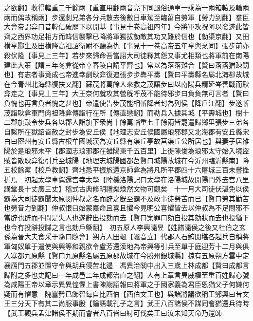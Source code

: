 之欲翻】收得輜重二千餘兩【重直用翻兩音亮下同風俗通車一乘為一兩箱轅及輪兩兩而偶故稱兩】步還劇兄弟各分兵散去後數日車駕至臨菑自勞軍【勞力到翻】羣臣大會帝謂弇曰昔韓信破歷下以開基【事見十卷高祖四年】今將軍攻祝阿以發迹此皆齊之西界功足相方而韓信襲擊已降將軍獨拔勍敵其功又難於信也【勍渠京翻】又田横亨酈生及田横降高祖詔衛尉不聽為仇【事見十一卷高帝五年亨與烹同】張步前亦殺伏隆【事見上三年】若步來歸命吾當詔大司徒釋其怨又事尤相類也將軍前在南陽建此大策【謂三年冬弇從帝幸舂陵自請平齊也】常以為落落難合【賢曰落落猶疎闊也】有志者事竟成也帝進幸劇耿弇復追張步步犇平夀【賢曰平壽縣名屬北海郡故城在今青州北海縣復扶又翻】蘇茂將萬餘人來救之茂讓步曰以南陽兵精延岑善戰而耿弇走之【事見丄三年】大王奈何就攻其營旣呼茂不能待邪步曰負負無可言者【賢曰負愧也再言負者愧之甚也】帝遣使告步茂能相斬降者封為列侯【降戶江翻】步遂斬茂詣耿弇軍門肉袒降弇傳詣行在所【傳直戀翻】而勒兵入據其城【平夀城也】樹十二郡旗鼔令步兵各以郡人詣旗下衆尚十餘萬輜重七千餘兩皆罷遣歸鄉里張步三弟各自繫所在獄詔皆赦之封步為安丘侯【地理志安丘侯國屬琅邪郡又北海郡有安丘縣宋白曰密州有安丘縣古根牟國城漢為安丘縣有渠丘亭故莒渠丘公所居也】與妻子居雒陽於是琅邪未平【郡國志琅邪郡在雒陽東千五百里】上徙陳俊為琅邪太守始入境盜賊皆散耿弇復引兵至城陽【地理志城陽國都莒賢曰城陽故城在今沂州臨沂縣南】降五校餘黨【校戶教翻】齊地悉平振旅還京師弇為將凡所平郡四十六屠城三百未嘗挫折焉　初起太學車駕還宫幸太學【陸機洛陽記曰太學在洛陽城故開陽門外去宫八里講堂長十丈廣三丈】稽式古典修明禮樂煥然文物可觀矣　十一月大司徒伏湛免以侯霸為大司徒霸聞太原閔仲叔之名而辟之旣至霸不及政事徒勞苦而已【賢曰勞其勤苦也勞音力到翻】仲叔恨曰始蒙嘉命且喜且懼今見明公喜懼皆去以仲叔為不足問邪不當辟也辟而不問是失人也遂辭出投劾而去【賢曰案罪曰劾自投其劾狀而去也投猶下也今冇投辭投牒之言也劾戶槩翻】　初五原人李興隨昱【姓譜隨侯之後又杜伯之玄孫為晉大夫食采于隨曰隨會】朔方人田颯【颯音立】代郡人石鮪閔堪各起兵自稱將軍匈奴單于遣使與興等和親欲令盧芳還漢地為帝興等引兵至單于庭迎芳十二月與俱入塞都九原縣【賢曰九原縣名屬五原郡故城在今勝州銀城縣】掠有五原朔方雲中定襄鴈門五郡並置守令與胡兵侵苦北邊　馮異治關中出入三歲上林成都【賢曰成都言歸附之多也史記曰一年成邑二年成都治直之翻】人有上章言異威權至重百姓歸心號為咸陽王帝以章示異異惶懼上書陳謝詔報曰將軍之于國家義為君臣恩猶父子何嫌何疑而有懼意　隗囂矜已飾智每自比西伯【西伯文王也】與諸將議欲稱王鄭興曰昔文王三分天下有其二尚服事殷【論語載孔子之言】武王八百諸侯不謀同會猶還兵待時【武王觀兵孟津諸侯不期而會者八百皆曰紂可伐矣王曰汝未知天命乃還師